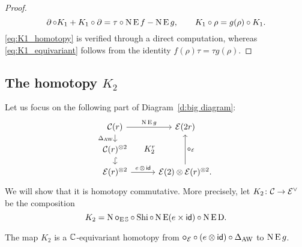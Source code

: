 \begin{proof}
	\TBW
	\[
	\operatorname{\partial} \mathbin{\circ} K_1 + K_1 \mathbin{\circ} \operatorname{\partial} = \tau \mathbin{\circ} \operatorname{N} \operatorname{E} f - \operatorname{N} \operatorname{E} g,
	\qquad
	K_1 \mathbin{\circ} \rho = g(\rho) \mathbin{\circ} K_1.
	\]
	\cref{eq:K1_homotopy} is verified through a direct computation, whereas \cref{eq:K1_equivariant} follows from the identity $f(\rho) \tau = \tau g(\rho)$.
\end{proof}

\subsection{The homotopy $K_2$}

Let us focus on the following part of Diagram~\eqref{d:big diagram}:
\begin{equation}\label{d:K2}
	\begin{tikzcd}[row sep=small]
		\cC(r)
		\arrow[r,"\chains\EE g"]
		\arrow[d,"\Delta_{\AW}"']
		\arrow[ddr,phantom,"K_2^r",shift left=0pt]
		&[5pt] \BE(2r)
		\\
		\cC(r)^{\ot 2}
		\arrow[d,hook] & \\
		\BE(r)^{\ot 2}
		\arrow[r,"e\, \ot\, \id"]
		& \BE(2) \ot \BE(r)^{\ot 2}.
		\arrow[uu,"\bcirc_\BE"']
	\end{tikzcd}
\end{equation}
We will show that it is homotopy commutative.
More precisely, let $K_2 \colon \mathcal{C} \to \mathcal{E}^\vee$ be the composition
\[
K_2 = \operatorname{N}\bm{\circ}_{\operatorname{E}\mathbb{S}} \mathbin{\circ} \operatorname{Shi} \mathbin{\circ} \operatorname{N}\operatorname{E}(e \times \mathsf{id}) \mathbin{\circ} \operatorname{N}\operatorname{E}\mathrm{D}.
\]

\begin{lemma}\label{l:K2}
	The map $K_2$ is a $\mathbb{C}$-equivariant homotopy from $\bm{\circ}_{\mathcal{E}} \mathbin{\circ} (e \otimes \mathsf{id}) \mathbin{\circ} \Delta_{\operatorname{AW}}$ to $\operatorname{N}\operatorname{E} g$.
\end{lemma}

